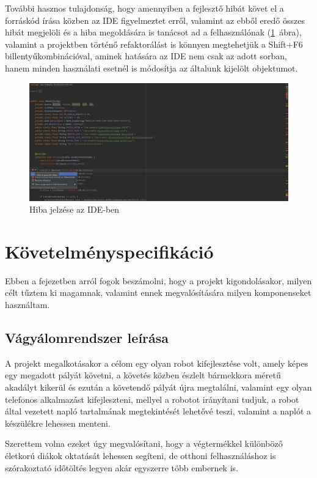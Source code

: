 \documentclass[]{thesis-ekf}
\theoremstyle{definition}
\begin{document}
További hasznos tulajdonság, hogy amennyiben a fejlesztő hibát követ el a forráskód írása közben az IDE figyelmeztet erről, valamint az ebből eredő összes hibát megjelöli és a hiba megoldására is tanácsot ad a felhasználónak (\ref{ide_hiba}~ábra), valamint a projektben történő refaktorálást is könnyen megtehetjük a Shift+F6 billentyűkombinációval, aminek hatására az IDE nem csak az adott sorban, hanem minden használati esetnél is módosítja az általunk kijelölt objektumot.
\begin{figure}[h]
	\centering
	\includegraphics[width=\linewidth]{images/android/ide_hibaérzékelés}
	\caption{Hiba jelzése az IDE-ben}
	\label{ide_hiba}
\end{figure}

\chapter{Követelményspecifikáció}\label{fejezet_2}
Ebben a fejezetben arról fogok beszámolni, hogy a projekt kigondolásakor, milyen célt tűztem ki magamnak, valamint ennek megvalósítására milyen komponenseket használtam.
\section{Vágyálomrendszer leírása}\label{vágyálom}
A projekt megalkotásakor a célom egy olyan robot kifejlesztése volt, amely képes egy megadott pályát követni, a követés közben észlelt bármekkora méretű akadályt kikerül és ezután a követendő pályát újra megtalálni, valamint egy olyan telefonos alkalmazást kifejleszteni, mellyel a robotot irányítani tudjuk, a robot által vezetett napló tartalmának megtekintését lehetővé teszi, valamint a naplót a készülékre lehessen menteni.

Szerettem volna ezeket úgy megvalósítani, hogy a végtermékkel különböző életkorú diákok oktatását lehessen segíteni, de otthoni felhasználáshoz is szórakoztató időtöltés legyen akár egyszerre több embernek is.
\end{document}
